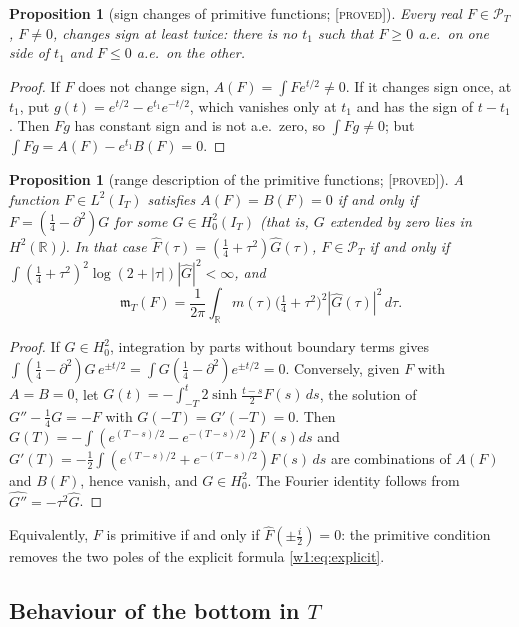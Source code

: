 \documentclass[11pt]{amsart}
\newtheorem{proposition}[theorem]{Proposition}
\theoremstyle{definition}
\theoremstyle{remark}
\numberwithin{equation}{section}
\newcommand{\R}{\mathbb{R}}
\newcommand{\IT}{I_T}                                  %
\newcommand{\Fh}{\widehat F}                           %
\newcommand{\PT}{\mathcal{P}_T}                        %
\newcommand{\mT}{\mathfrak{m}_T}                       %
\newcommand{\stag}[1]{\textsc{[#1]}}
\newcommand{\PROVED}{\stag{proved}}
\begin{document}
\begin{proposition}[sign changes of primitive functions; \PROVED]\label{w2:prop:signchange}
Every real $F\in\PT$, $F\ne0$, changes sign at least twice: there is no $t_1$ such that $F\ge0$ a.e.\ on one side of
$t_1$ and $F\le0$ a.e.\ on the other.
\end{proposition}

\begin{proof}
If $F$ does not change sign, $A(F)=\int Fe^{t/2}\ne0$. If it changes sign once, at $t_1$, put
$g(t)=e^{t/2}-e^{t_1}e^{-t/2}$, which vanishes only at $t_1$ and has the sign of $t-t_1$. Then $Fg$ has constant sign
and is not a.e.\ zero, so $\int Fg\ne0$; but $\int Fg=A(F)-e^{t_1}B(F)=0$.
\end{proof}

\begin{proposition}[range description of the primitive functions; \PROVED]\label{w2:prop:range}
A function $F\in L^2(\IT)$ satisfies $A(F)=B(F)=0$ if and only if $F=(\frac14-\partial^2)G$ for some $G\in H^2_0(\IT)$
(that is, $G$ extended by zero lies in $H^2(\R)$). In that case $\Fh(\tau)=(\frac14+\tau^2)\widehat G(\tau)$, $F\in\PT$
if and only if $\int(\frac14+\tau^2)^2\log(2+|\tau|)|\widehat G|^2<\infty$, and
\[
\mT(F)=\frac1{2\pi}\int_\R m(\tau)\bigl(\tfrac14+\tau^2\bigr)^2|\widehat G(\tau)|^2\,d\tau .
\]
\end{proposition}

\begin{proof}
If $G\in H^2_0$, integration by parts without boundary terms gives
$\int(\frac14-\partial^2)G\,e^{\pm t/2}=\int G(\frac14-\partial^2)e^{\pm t/2}=0$. Conversely, given $F$ with $A=B=0$,
let $G(t)=-\int_{-T}^t2\sinh\frac{t-s}2F(s)\,ds$, the solution of $G''-\frac14G=-F$ with $G(-T)=G'(-T)=0$. Then
$G(T)=-\int(e^{(T-s)/2}-e^{-(T-s)/2})F(s)ds$ and $G'(T)=-\frac12\int(e^{(T-s)/2}+e^{-(T-s)/2})F(s)\,ds$ are combinations of
$A(F)$ and $B(F)$, hence vanish, and $G\in H^2_0$. The Fourier identity follows from $\widehat{G''}=-\tau^2\widehat G$.
\end{proof}

Equivalently, $F$ is primitive if and only if $\Fh(\pm\frac i2)=0$: the primitive condition removes the two poles of the
explicit formula \eqref{w1:eq:explicit}.

\subsection{Behaviour of the bottom in \texorpdfstring{$T$}{T}}
\end{document}
